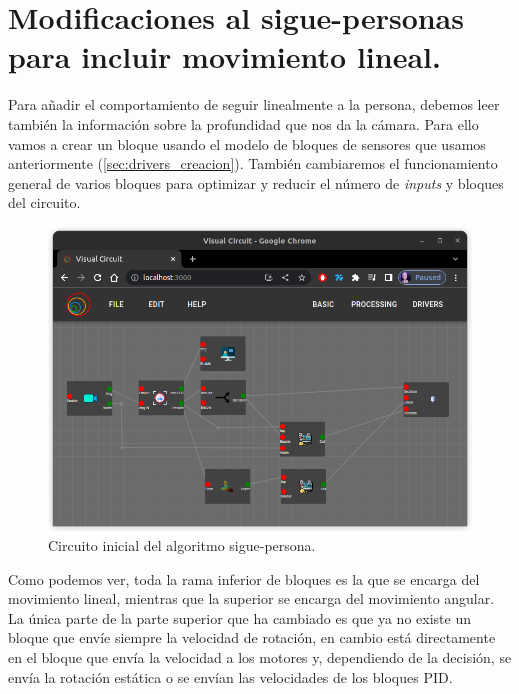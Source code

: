 \section{Modificaciones al sigue-personas para incluir movimiento lineal.}
\label{sec:FP_2}

Para añadir el comportamiento de seguir linealmente a la persona, debemos leer también la información sobre la profundidad que nos da la cámara.
Para ello vamos a crear un bloque usando el modelo de bloques de sensores que usamos anteriormente (\ref{sec:drivers_creacion}).
También cambiaremos el funcionamiento general de varios bloques para optimizar y reducir el número de \textit{inputs} y bloques del circuito.

\begin{figure} [H]
    \begin{center}
        \includegraphics[width=12cm]{figs/c5/follow_person_final_model.png}
    \end{center}
    \caption[Circuito sigue-personas inicial]{Circuito inicial del algoritmo sigue-persona.}
    \label{fig:initial_follow_person}
\end{figure}

Como podemos ver, toda la rama inferior de bloques es la que se encarga del movimiento lineal, mientras que la superior se encarga del movimiento angular.
La única parte de la parte superior que ha cambiado es que ya no existe un bloque que envíe siempre la velocidad de rotación, en cambio está directamente en el
bloque que envía la velocidad a los motores y, dependiendo de la decisión, se envía la rotación estática o se envían las velocidades de los bloques PID.

